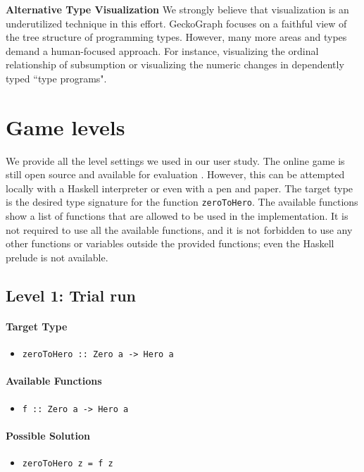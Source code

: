 \documentclass[preprint,12pt]{elsarticle}
\begin{document}
\noindent\textbf{Alternative Type Visualization}
We strongly believe that visualization is an underutilized technique in this effort. GeckoGraph focuses on a faithful view of the tree structure of programming types. However, many more areas and types demand a human-focused approach. For instance, visualizing the ordinal relationship of subsumption or visualizing the numeric changes in dependently typed ``type programs". 

 


\appendix
\section{Game levels} \label{levels}
We provide all the level settings we used in our user study. The online game is still open source and available for evaluation \cite{Anonymous_undated-ne}. However, this can be attempted locally with a Haskell interpreter or even with a pen and paper. The target type is the desired type signature for the function \texttt{zeroToHero}. The available functions show a list of functions that are allowed to be used in the implementation. It is not required to use all the available functions, and it is not forbidden to use any other functions or variables outside the provided functions; even the Haskell prelude is not available. 


\subsection{Level 1: Trial run}

\paragraph{Target Type } 
\begin{itemize}
    \item \texttt{zeroToHero :: Zero a -> Hero a}
\end{itemize}

\paragraph{Available Functions} 
\begin{itemize}
    \item \texttt{f :: Zero a -> Hero a}
\end{itemize}

\paragraph{Possible Solution} 
\begin{itemize}
    \item \texttt{zeroToHero z = f z}
\end{itemize}
\end{document}
